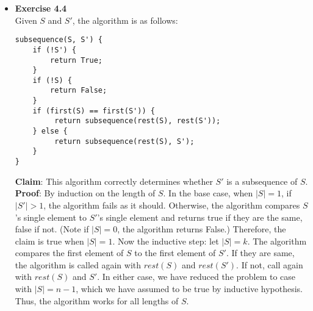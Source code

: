 \documentclass[a4paper]{article}
\begin{document}
\begin{itemize}
\item{\textbf{Exercise 4.4}} \\
Given $S$ and $S'$, the algorithm is as follows:
\begin{verbatim}
subsequence(S, S') {
    if (!S') {
        return True;
    }
    if (!S) {
        return False;
    }
    if (first(S) == first(S')) {
         return subsequence(rest(S), rest(S'));
    } else {
         return subsequence(rest(S), S');
    }
}
\end{verbatim}
\textbf{Claim}: This algorithm correctly determines whether $S'$ is a subsequence of $S$. \\ 
\textbf{Proof}: By induction on the length of $S$. In the base case, when $|S| = 1$, if $|S'| > 1$, the algorithm fails as it should. Otherwise, the algorithm compares $S$'s single element to $S'$'s single element and returns true if they are the same, false if not. (Note if $|S| = 0$, the algorithm returns False.) Therefore, the claim is true when $|S| = 1$. Now the inductive step: let $|S| = k$. The algorithm compares the first element of $S$ to the first element of $S'$. If they are same, the algorithm is called again with $rest(S)$ and $rest(S')$. If not, call again with $rest(S)$ and $S'$. In either case, we have reduced the problem to case with $|S| = n-1$, which we have assumed to be true by inductive hypothesis. Thus, the algorithm works for all lengths of $S$.   \\


\end{itemize}
\end{document}

